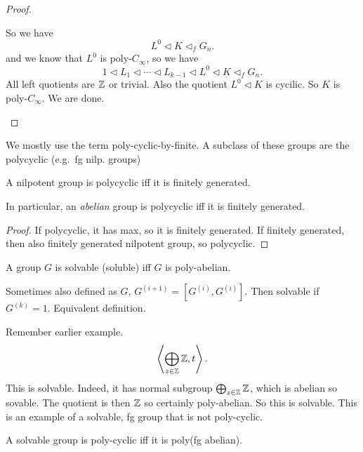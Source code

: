 \begin{proof}
\begin{itemize}
            So we have
            \[
            L^0 \triangleleft K \triangleleft_f G_n
            .\] 
            and we know that $L^{0}$ is poly-$C_{\infty}$, so we have
            \[
            1 \triangleleft L_1 \triangleleft \cdots \triangleleft L_{k-1}\triangleleft L^{0}\triangleleft K \triangleleft _f G_n
            .\] 
            All left quotients are $\mathbb{Z}$ or trivial.
            Also the quotient $L^{0} \triangleleft K$ is cycilic.
            So $K$ is poly-$C_\infty$.
            We are done.
    \end{itemize}
\end{proof}

\begin{remark}
    We mostly use the term poly-cyclic-by-finite.
    A subclass of these groups are the polycyclic (e.g.\ fg nilp. groups)
\end{remark}

\begin{lemma}
    A nilpotent group is polycyclic iff it is finitely generated.

    In particular, an \emph{abelian} group is polycyclic iff it is finitely generated.
\end{lemma}
\begin{proof}
    If polycyclic, it has max, so it is finitely generated.
    If finitely generated, then also finitely generated nilpotent group, so polycyclic.
\end{proof}

\begin{definition}
    A group $G$ is solvable (soluble) iff $G$ is poly-abelian.
\end{definition}

\begin{remark}
    Sometimes also defined as $G$,  $G^{(i+1)} = [G^{(i)}, G^{(i)}]$.
    Then solvable if $G^{(k)} = 1$.
    Equivalent definition.
\end{remark}

\begin{remark}
    Remember earlier example.
    \[
    \left<\bigoplus_{z \in \mathbb{Z}} \mathbb{Z}, t\right>
    .\] 
    This is solvable.
    Indeed, it has normal subgroup $\bigoplus_{z \in \mathbb{Z}} \mathbb{Z}$, which is abelian so sovable. The quotient is then  $\mathbb{Z}$ so certainly poly-abelian.
    So this is solvable.
    This is an example of a solvable, fg group that is not poly-cyclic.
\end{remark}

\begin{remark}
    A solvable group is poly-cyclic iff it is poly(fg abelian).
\end{remark}
